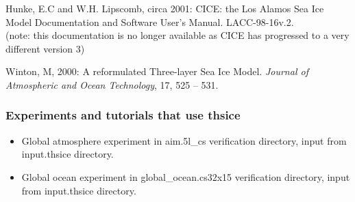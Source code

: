 \vspace{.2cm}

\noindent
Hunke, E.C and W.H. Lipscomb, circa 2001: CICE: the Los Alamos
Sea Ice Model Documentation and Software User's Manual.
LACC-98-16v.2.\\
(note: this documentation is no longer available as CICE has progressed
to a very different version 3)


\vspace{.2cm}

\noindent
Winton, M, 2000: A reformulated Three-layer Sea Ice Model.
{\it Journal of Atmospheric and Ocean Technology}, 17, 525 -- 531.




\subsubsection{Experiments and tutorials that use thsice}
\label{sec:pkg:thsice:experiments}

\begin{itemize}
\item{Global atmosphere experiment in aim.5l\_cs verification directory, input from input.thsice directory.}
\item{Global ocean experiment in global\_ocean.cs32x15 verification directory, input from input.thsice directory.}
\end{itemize}

